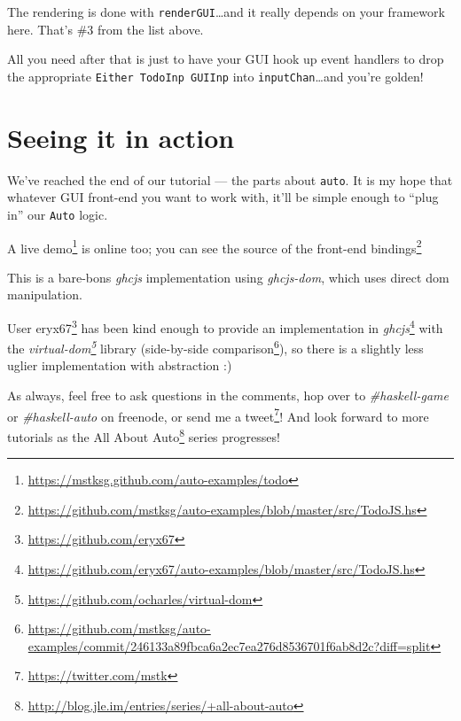 \documentclass[]{article}
\renewcommand{\href}[2]{#2\footnote{\url{#1}}}
\begin{document}
The rendering is done with \texttt{renderGUI}\ldots{}and it really
depends on your framework here. That's \#3 from the list above.

All you need after that is just to have your GUI hook up event handlers
to drop the appropriate \texttt{Either\ TodoInp\ GUIInp} into
\texttt{inputChan}\ldots{}and you're golden!

\section{Seeing it in action}\label{seeing-it-in-action}

We've reached the end of our tutorial --- the parts about \texttt{auto}.
It is my hope that whatever GUI front-end you want to work with, it'll
be simple enough to ``plug in'' our \texttt{Auto} logic.

A \href{https://mstksg.github.com/auto-examples/todo}{live demo} is
online too; you can see
\href{https://github.com/mstksg/auto-examples/blob/master/src/TodoJS.hs}{the
source of the front-end bindings}

This is a bare-bons \emph{ghcjs} implementation using \emph{ghcjs-dom},
which uses direct dom manipulation.

User \href{https://github.com/eryx67}{eryx67} has been kind enough to
provide
\href{https://github.com/eryx67/auto-examples/blob/master/src/TodoJS.hs}{an
implementation in \emph{ghcjs}} with the
\emph{\href{https://github.com/ocharles/virtual-dom}{virtual-dom}}
library
(\href{https://github.com/mstksg/auto-examples/commit/246133a89fbca6a2ec7ea276d8536701f6ab8d2c?diff=split}{side-by-side
comparison}), so there is a slightly less uglier implementation with
abstraction :)

As always, feel free to ask questions in the comments, hop over to
\emph{\#haskell-game} or \emph{\#haskell-auto} on freenode, or send me a
\href{https://twitter.com/mstk}{tweet}! And look forward to more
tutorials as the
\href{http://blog.jle.im/entries/series/+all-about-auto}{All About Auto}
series progresses!
\end{document}
